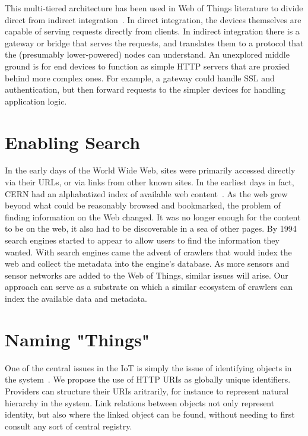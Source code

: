 \documentclass{acm_proc_article-sp}
\begin{document}
This multi-tiered architecture has been used in Web of Things literature to
divide direct from indirect integration~\cite{wotsurvey}. In direct
integration, the devices themselves are capable of serving requests directly
from clients. In indirect integration there is a gateway or bridge that serves
the requests, and translates them to a protocol that the (presumably
lower-powered) nodes can understand. An unexplored middle ground is for end devices
to function as simple HTTP servers that are proxied behind more complex ones. For
example, a gateway could handle SSL and authentication, but then forward requests
to the simpler devices for handling application logic.

\section{Enabling Search}

In the early days of the World Wide Web, sites were primarily accessed directly
via their URLs, or via links from other known sites. In the earliest days in
fact, CERN had an alphabatized index of available web
content~\cite{websearchengines}. As the web grew beyond what could be
reasonably browsed and bookmarked, the problem of finding information on the
Web changed. It was no longer enough for the content to be on the web, it also
had to be discoverable in a sea of other pages. By 1994 search engines started
to appear to allow users to find the information they wanted. With search
engines came the advent of crawlers that would index the web and collect the
metadata into the engine's database. As more sensors and sensor networks are
added to the Web of Things, similar issues will arise. Our approach can serve
as a substrate on which a similar ecosystem of crawlers can index the available
data and metadata.

\section{Naming "Things"}

One of the central issues in the IoT is simply the issue of identifying objects
in the system~\cite{iotsurvey}. We propose the use of HTTP URIs as globally
unique identifiers.  Providers can structure their URIs aritrarily, for
instance to represent natural hierarchy in the system. Link relations between
objects not only represent identity, but also where the linked object can be
found, without needing to first consult any sort of central registry.
\end{document}
